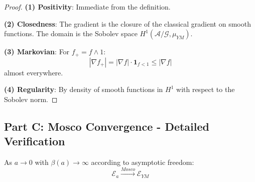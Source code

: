 \begin{proof}
\textbf{(1) Positivity}: Immediate from the definition.

\textbf{(2) Closedness}: The gradient is the closure of the classical gradient 
on smooth functions. The domain is the Sobolev space $H^1(\mathcal{A}/\mathcal{G}, \mu_{YM})$.

\textbf{(3) Markovian}: For $f_+ = f \wedge 1$:
\begin{equation}
|\nabla f_+| = |\nabla f| \cdot \mathbf{1}_{f < 1} \leq |\nabla f|
\end{equation}
almost everywhere.

\textbf{(4) Regularity}: By density of smooth functions in $H^1$ with respect 
to the Sobolev norm.
\end{proof}

\subsection{Part C: Mosco Convergence - Detailed Verification}

\begin{theorem}
\label{thm:mosco-detailed}
As $a \to 0$ with $\beta(a) \to \infty$ according to asymptotic freedom:
\begin{equation}
\mathcal{E}_a \xrightarrow{Mosco} \mathcal{E}_{YM}
\end{equation}
\end{theorem}

